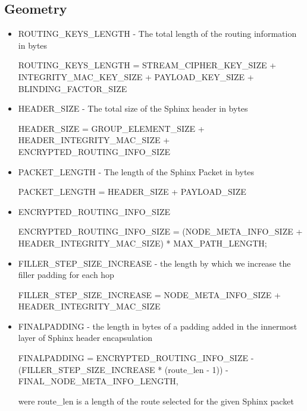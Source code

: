 \subsection{Geometry}\label{sec:geometry}
\begin{itemize}
    \item ROUTING\_KEYS\_LENGTH - The total length of the routing information in bytes
    \bigskip
    
        ROUTING\_KEYS\_LENGTH = 
        STREAM\_CIPHER\_KEY\_SIZE + INTEGRITY\_MAC\_KEY\_SIZE + 
         PAYLOAD\_KEY\_SIZE 
        + BLINDING\_FACTOR\_SIZE
    \item HEADER\_SIZE - The total size of the Sphinx header in bytes 
    \bigskip
    
        HEADER\_SIZE = GROUP\_ELEMENT\_SIZE + HEADER\_INTEGRITY\_MAC\_SIZE + ENCRYPTED\_ROUTING\_INFO\_SIZE
    \item PACKET\_LENGTH - The length of the Sphinx Packet in bytes
    \bigskip 
    
        PACKET\_LENGTH = HEADER\_SIZE + PAYLOAD\_SIZE
        
    \item ENCRYPTED\_ROUTING\_INFO\_SIZE
    \bigskip
    
    ENCRYPTED\_ROUTING\_INFO\_SIZE = (NODE\_META\_INFO\_SIZE + HEADER\_INTEGRITY\_MAC\_SIZE) * MAX\_PATH\_LENGTH;
    
    \item FILLER\_STEP\_SIZE\_INCREASE - the length by which we increase the filler padding for each hop
    \bigskip
    
    FILLER\_STEP\_SIZE\_INCREASE = NODE\_META\_INFO\_SIZE + HEADER\_INTEGRITY\_MAC\_SIZE
    
    \item FINALPADDING - the length in bytes of a padding added in the innermost layer of Sphinx header encapsulation
    \bigskip
    
    FINALPADDING = ENCRYPTED\_ROUTING\_INFO\_SIZE 
                - (FILLER\_STEP\_SIZE\_INCREASE * (route\_len - 1)) - FINAL\_NODE\_META\_INFO\_LENGTH,
                
    \bigskip were route\_len is a length of the route selected for the given Sphinx packet
    
\end{itemize}